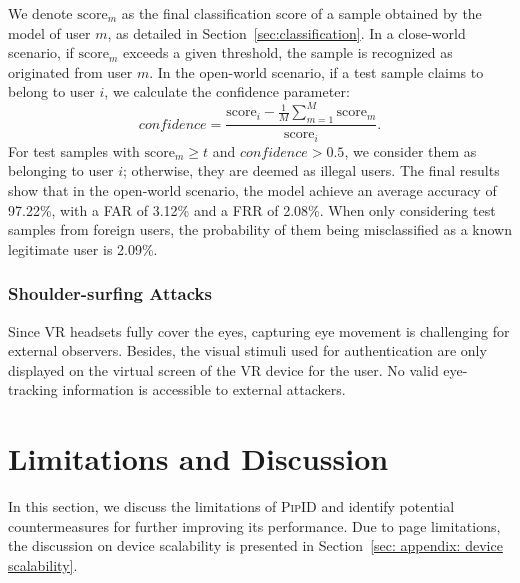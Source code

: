 \documentclass[sigconf]{acmart}
\newcommand{\sysname}{\textsc{PipID}\xspace}
\begin{document}
We denote $\text{score}_{m}$ as the final classification score of a sample obtained by the model of user $m$, as detailed in Section~\ref{sec:classification}. In a close-world scenario, if $\text{score}_{m}$ exceeds a given threshold, the sample is recognized as originated from user $m$. In the open-world scenario, if a test sample claims to belong to user $i$, we calculate the confidence parameter: 
\begin{equation}
    confidence = \frac{\text{score}_{i} - \frac{1}{M}\sum _{m=1}^M \text{score}_{m}}{\text{score}_{i}}.
\end{equation}
For test samples with $\text{score}_{m} \geq t$ and $confidence > 0.5$, we consider them as belonging to user $i$; otherwise, they are deemed as illegal users. The final results show that in the open-world scenario, the model achieve an average accuracy of 97.22\%, with a FAR of 3.12\% and a FRR of 2.08\%. When only considering test samples from foreign users, the probability of them being misclassified as a known legitimate user is 2.09\%.

\subsubsection{Shoulder-surfing Attacks}
Since VR headsets fully cover the eyes, capturing eye movement is challenging for external observers. Besides, the visual stimuli used for authentication are only displayed on the virtual screen of the VR device for the user. No valid eye-tracking information is accessible to external attackers.




\section{Limitations and Discussion}
\label{sec:Limitations}

In this section, we discuss the limitations of \sysname and identify potential countermeasures for further improving its performance. Due to page limitations, the discussion on device scalability is presented in Section~\ref{sec: appendix: device scalability}.
\end{document}
